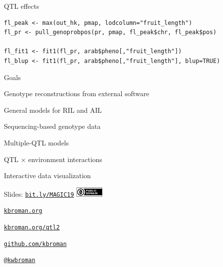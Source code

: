 \documentclass[12pt,t,aspectratio=1610]{beamer}
\begin{document}
\begin{frame}[c,fragile]{QTL effects}

\begin{center} \begin{minipage}[c]{11.3cm} \begin{semiverbatim}
\begin{lstlisting}[linewidth=11.3cm]
fl_peak <- max(out_hk, pmap, lodcolumn="fruit_length")
fl_pr <- pull_genoprobpos(pr, pmap, fl_peak$chr, fl_peak$pos)

fl_fit1 <- fit1(fl_pr, arab$pheno[,"fruit_length"])
fl_blup <- fit1(fl_pr, arab$pheno[,"fruit_length"], blup=TRUE)
\end{lstlisting}
\end{semiverbatim} \end{minipage} \end{center}

\end{frame}









\begin{frame}{Goals}

  \bbi
\item Genotype reconstructions from external software

\item General models for RIL and AIL

\item Sequencing-based genotype data

\item Multiple-QTL models

\item QTL $\times$ environment interactions

\item Interactive data visualization
  \ei

\end{frame}




\begin{frame}[c]{}

\Large

Slides: \href{https://bit.ly/MAGIC19}{\tt bit.ly/MAGIC19} \quad
\includegraphics[height=5mm]{Figs/cc-zero.png}

\vspace{7mm}

\href{https://kbroman.org}{\tt \lolit kbroman.org}

\vspace{7mm}

\href{https://kbroman.org/qtl2}{\tt kbroman.org/qtl2}

\vspace{7mm}

\href{https://github.com/kbroman}{\tt \lolit github.com/kbroman}

\vspace{7mm}

\href{https://twitter.com/kwbroman}{\tt \lolit @kwbroman}


\end{frame}
\end{document}
